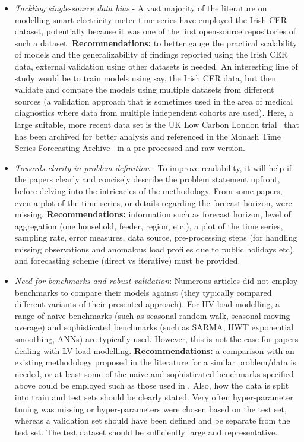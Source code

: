 \begin{itemize}
	\item \textit{Tackling single-source data bias} - A vast majority of the literature on modelling smart electricity meter time series have employed the Irish CER dataset, potentially because it was one of the first open-source repositories of such a dataset. \textbf{Recommendations:} to better gauge the practical scalability of models and the generalizability of findings reported using the Irish CER data, external validation using other datasets is needed. An interesting line of study would be to train models using say, the Irish CER data, but then validate and compare the models using multiple datasets from different sources (a validation approach that is sometimes used in the area of medical diagnostics where data from multiple independent cohorts are used).  Here, a large suitable, more recent data set is the UK Low Carbon London trial~\cite{UK2014ulc} that has been archived for better analysis and referenced in the Monash Time Series Forecasting Archive~\cite{godahewa2021mts} in a pre-processed and raw version.
	
	\item \textit{Towards clarity in problem definition} -  To improve readability, it will help if the papers clearly and concisely describe the problem statement upfront, before delving into the intricacies of the methodology. From some papers, even a plot of the time series, or details regarding the forecast horizon, were missing. \textbf{Recommendations:} information such as forecast horizon, level of aggregation (one household, feeder, region, etc.), a plot of the time series, sampling rate, error measures, data source, pre-processing steps (for handling missing observations and anomalous load profiles due to public holidays etc), and forecasting scheme (direct vs iterative) must be provided. 
	
	\item \textit{Need for benchmarks and robust validation}: Numerous articles did not employ benchmarks to compare their models against (they typically compared different variants of their presented approach). For HV load modelling, a range of naive benchmarks (such as seasonal random walk, seasonal moving average) and sophisticated benchmarks (such as SARMA, HWT exponential smoothing, ANNs) are typically used. However, this is not the case for papers dealing with LV load modelling. \textbf{Recommendations:} a comparison with an existing methodology proposed in the literature for a similar problem/data is needed, or at least some of the naive and sophisticated benchmarks specified above could be employed such as those used in \cite{Haben2019stl}. Also, how the data is split into train and test sets should be clearly stated. Very often hyper-parameter tuning was missing or hyper-parameters were chosen based on the test set, whereas a validation set should have been defined and be separate from the test set. The test dataset should be sufficiently large and representative.
	

\end{itemize}
